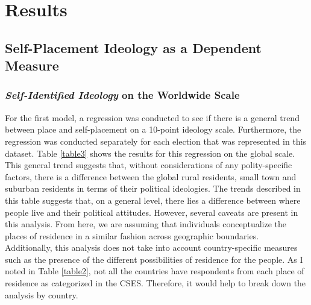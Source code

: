 \documentclass[12pt, titlepage]{article}
\newcommand\e{\emph}
\begin{document}
\section{Results}

\subsection{Self-Placement Ideology as a Dependent Measure}

\subsubsection{\e{Self-Identified Ideology} on the Worldwide Scale}

For the first model, a regression was conducted to see if there is a general trend between place and self-placement on a 10-point ideology scale. Furthermore, the regression was conducted separately for each election that was represented in this dataset. Table \ref{table3} shows the results for this regression on the global scale. This general trend suggests that, without considerations of any polity-specific factors, there is a difference between the global rural residents, small town and suburban residents in terms of their political ideologies. The trends described in this table suggests that, on a general level, there lies a difference between where people live and their political attitudes. However, several caveats are present in this analysis. From here, we are assuming that individuals conceptualize the places of residence in a similar fashion across geographic boundaries. Additionally, this analysis does not take into account country-specific measures such as the presence of the different possibilities of residence for the people. As I noted in Table \ref{table2}, not all the countries have respondents from each place of residence as categorized in the CSES. Therefore, it would help to break down the analysis by country.
\end{document}
